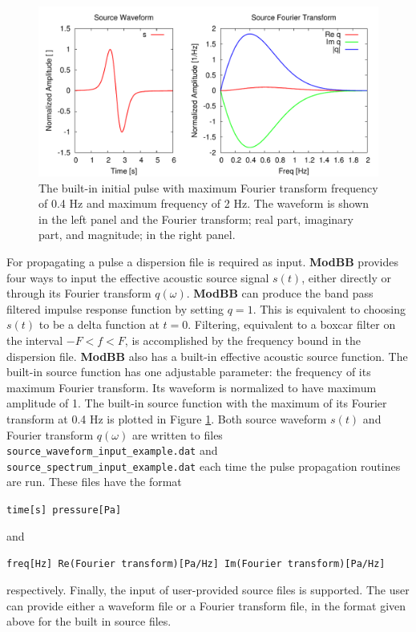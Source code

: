 \begin{figure}
\begin{center}
\includegraphics[scale=0.65]{figs/initial_pulse_model.pdf}
\end{center}
\caption{The built-in initial pulse with maximum Fourier transform frequency of 0.4 Hz and maximum frequency of 2 Hz. The waveform is shown in the left panel and the Fourier transform; real part, imaginary part, and magnitude; in the right panel. }
\label{fig: initial_pulse}
\end{figure}

For propagating a pulse a dispersion file is required as input. {\bf ModBB} provides four ways to input the effective acoustic source signal $s(t)$, either directly or through its Fourier transform $q(\omega)$. {\bf ModBB} can produce the band pass filtered impulse response function by setting $q=1$. This is equivalent to choosing $s(t)$ to be a delta function at $t=0$. Filtering, equivalent to a boxcar filter on the interval $-F<f<F$, is accomplished by the frequency bound in the dispersion file. {\bf ModBB} also has a built-in effective acoustic source function. The built-in source function has one adjustable parameter: the frequency of its maximum Fourier transform. Its waveform is normalized to have maximum amplitude of 1. The built-in source function with the maximum of its Fourier transform at 0.4 Hz is plotted in Figure \ref{fig: initial_pulse}. Both source waveform $s(t)$ and Fourier transform $q(\omega)$ are written to files \verb+source_waveform_input_example.dat+ and \verb+source_spectrum_input_example.dat+ each time the pulse propagation routines are run. These files have the format \begin{center}\verb+time[s] pressure[Pa]+\end{center} 
and 
\begin{center}\verb+freq[Hz] Re(Fourier transform)[Pa/Hz] Im(Fourier transform)[Pa/Hz]+\end{center} 
respectively. Finally, the input of user-provided source files is supported. The user can provide either a waveform file or a Fourier transform file, in the format given above for the built in source files. 


